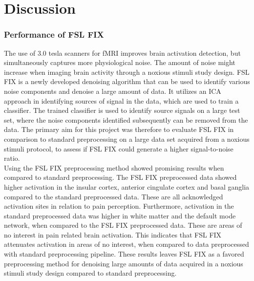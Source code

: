 \chapter{Discussion}
\subsection*{Performance of FSL FIX}
The use of 3.0 tesla scanners for fMRI improves brain activation detection, but simultaneously captures more physiological noise. The amount of noise might increase when imaging brain activity through a noxious stimuli study design. FSL FIX is a newly developed denoising algorithm that can be used to identify various noise components and denoise a large amount of data. It utilizes an ICA approach in identifying sources of signal in the data, which are used to train a classifier. The trained classifier is used to identify source signals on a large test set, where the noise components identified subsequently can be removed from the data. The primary aim for this project was therefore to evaluate FSL FIX in comparison to standard preprocessing on a large data set acquired from a noxious stimuli protocol, to assess if FSL FIX could generate a higher signal-to-noise ratio. \\
Using the FSL FIX preprocessing method showed promising results when compared to standard preprocessing. The FSL FIX preprocessed data showed higher activation in the insular cortex, anterior cingulate cortex and basal ganglia compared to the standard preprocessed data. These are all acknowledged activation sites in relation to pain perception. Furthermore, activation in the standard preprocessed data was higher in white matter and the default mode network, when compared to the FSL FIX preprocessed data. These are areas of no interest in pain related brain activation. This indicates that FSL FIX attenuates activation in areas of no interest, when compared to data preprocessed with standard preprocessing pipeline. These results leaves FSL FIX as a favored preprocessing method for denoising large amounts of data acquired in a noxious stimuli study design compared to standard preprocessing. 

